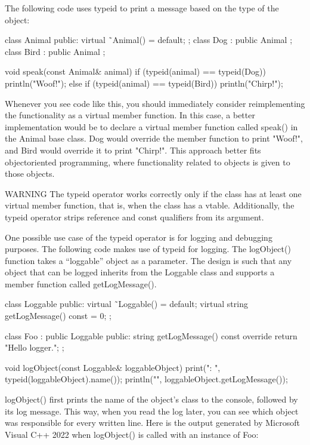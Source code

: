 The following code uses typeid to print a message based on the type of the object:

\begin{cpp}
class Animal { public: virtual ˜Animal() = default; };
class Dog : public Animal {};
class Bird : public Animal {};

void speak(const Animal& animal)
{
    if (typeid(animal) == typeid(Dog)) {
        println("Woof!");
    } else if (typeid(animal) == typeid(Bird)) {
        println("Chirp!");
    }
}
\end{cpp}

Whenever you see code like this, you should immediately consider reimplementing the functionality as a virtual member function. In this case, a better implementation would be to declare a virtual member function called speak() in the Animal base class. Dog would override the member function to print "Woof!", and Bird would override it to print "Chirp!". This approach better fits objectoriented programming, where functionality related to objects is given to those objects.

\begin{myWarning}{WARNING}
 The typeid operator works correctly only if the class has at least one virtual member function, that is, when the class has a vtable. Additionally, the typeid operator strips reference and const qualifiers from its argument.
\end{myWarning}

One possible use case of the typeid operator is for logging and debugging purposes. The following code makes use of typeid for logging. The logObject() function takes a “loggable” object as a parameter. The design is such that any object that can be logged inherits from the Loggable class and supports a member function called getLogMessage().

\begin{cpp}
class Loggable
{
    public:
        virtual ˜Loggable() = default;
        virtual string getLogMessage() const = 0;
};

class Foo : public Loggable
{
    public:
        string getLogMessage() const override { return "Hello logger."; }
};

void logObject(const Loggable& loggableObject)
{
    print("{}: ", typeid(loggableObject).name());
    println("{}", loggableObject.getLogMessage());
}
\end{cpp}

logObject() first prints the name of the object’s class to the console, followed by its log message.
This way, when you read the log later, you can see which object was responsible for every written line. Here is the output generated by Microsoft Visual C++ 2022 when logObject() is called with an instance of Foo:

